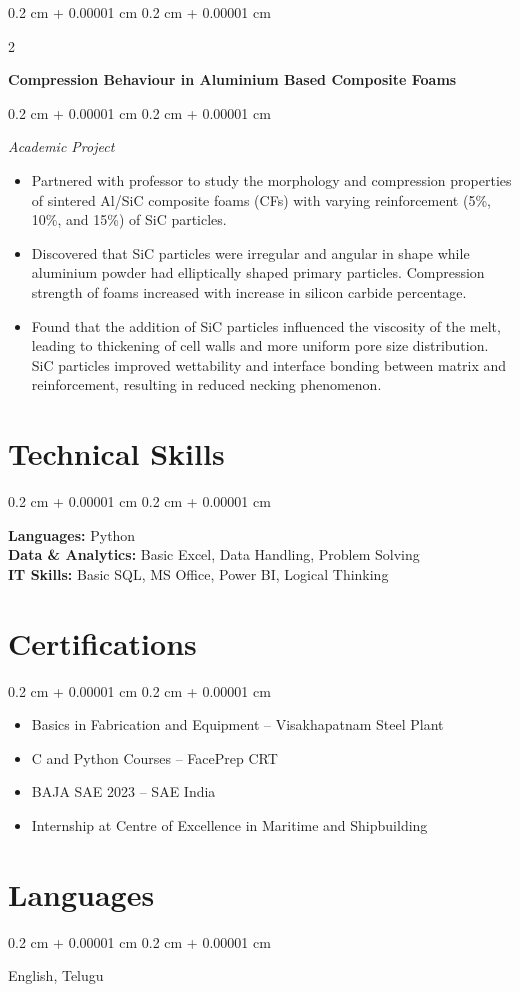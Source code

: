 \documentclass[10pt, letterpaper]{article}
\newenvironment{highlights}{
    \begin{itemize}[
        topsep=0.10 cm,
        parsep=0.10 cm,
        partopsep=0pt,
        itemsep=0pt,
        leftmargin=0.4 cm + 10pt
    ]
}{
    \end{itemize}
} %
\newenvironment{onecolentry}{
    \begin{adjustwidth}{
        0.2 cm + 0.00001 cm
    }{
        0.2 cm + 0.00001 cm
    }
}{
    \end{adjustwidth}
} %
\newenvironment{twocolentry}[2][]{
    \onecolentry
    \def\secondColumn{#2}
    \setcolumnwidth{\fill, 4.5 cm}
    \begin{paracol}{2}
}{
    \switchcolumn \raggedleft \secondColumn
    \end{paracol}
    \endonecolentry
} %
\begin{document}
    \vspace{0.2 cm}
    \begin{twocolentry}{}
        \textbf{Compression Behaviour in Aluminium Based Composite Foams}
    \end{twocolentry}
    \vspace{0.10 cm}
    \begin{onecolentry}
        \textit{Academic Project}
        \begin{highlights}
            \item Partnered with professor to study the morphology and compression properties of sintered Al/SiC composite foams (CFs) with varying reinforcement (5\%, 10\%, and 15\%) of SiC particles.
            \item Discovered that SiC particles were irregular and angular in shape while aluminium powder had elliptically shaped primary particles. Compression strength of foams increased with increase in silicon carbide percentage.
            \item Found that the addition of SiC particles influenced the viscosity of the melt, leading to thickening of cell walls and more uniform pore size distribution. SiC particles improved wettability and interface bonding between matrix and reinforcement, resulting in reduced necking phenomenon.
        \end{highlights}
    \end{onecolentry}

    \section{Technical Skills}
    \begin{onecolentry}
        \textbf{Languages:} Python \\
        \textbf{Data \& Analytics:} Basic Excel, Data Handling, Problem Solving \\
        \textbf{IT Skills:} Basic SQL, MS Office, Power BI, Logical Thinking
    \end{onecolentry}

    \section{Certifications}
    \begin{onecolentry}
        \begin{highlights}
            \item Basics in Fabrication and Equipment – Visakhapatnam Steel Plant
            \item C and Python Courses – FacePrep CRT
            \item BAJA SAE 2023 – SAE India
            \item Internship at Centre of Excellence in Maritime and Shipbuilding
        \end{highlights}
    \end{onecolentry}

    \section{Languages}
    \begin{onecolentry}
        English, Telugu
    \end{onecolentry}
\end{document}
